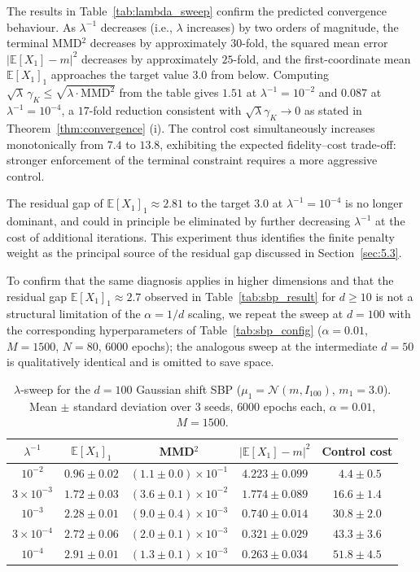 \documentclass[11pt,leqno]{article}
\theoremstyle{plain}
\theoremstyle{remark}
\theoremstyle{definition}
\numberwithin{equation}{section}
\numberwithin{figure}{section}
\numberwithin{table}{section}
\numberwithin{algorithm}{section}
\newcommand{\EE}{\mathbb{E}}
\begin{document}
The results in Table~\ref{tab:lambda_sweep} confirm the predicted convergence behaviour.
As $\lambda^{-1}$ decreases (i.e., $\lambda$ increases) by two orders of magnitude,
the terminal MMD${}^2$ decreases by approximately $30$-fold,
the squared mean error $|\EE[X_1]-m|^2$ decreases by approximately $25$-fold,
and the first-coordinate mean $\EE[X_1]_1$ approaches the target value $3.0$ from below.
Computing $\sqrt{\lambda}\,\gamma_K\le \sqrt{\lambda\cdot\mathrm{MMD}^2}$ from the table gives
$1.51$ at $\lambda^{-1}=10^{-2}$ and $0.087$ at $\lambda^{-1}=10^{-4}$,
a $17$-fold reduction consistent with $\sqrt{\lambda}\gamma_K\to 0$ as stated in Theorem~\ref{thm:convergence} (i).
The control cost simultaneously increases monotonically from $7.4$ to $13.8$,
exhibiting the expected fidelity--cost trade-off:
stronger enforcement of the terminal constraint requires a more aggressive control.

The residual gap of $\EE[X_1]_1 \approx 2.81$ to the target $3.0$ at $\lambda^{-1}=10^{-4}$
is no longer dominant, and could in principle be eliminated by further decreasing $\lambda^{-1}$ at the cost of additional iterations.
This experiment thus identifies the finite penalty weight as the principal source of the residual gap
discussed in Section~\ref{sec:5.3}.

To confirm that the same diagnosis applies in higher dimensions and that the residual gap
$\EE[X_1]_1\approx 2.7$ observed in Table~\ref{tab:sbp_result} for $d\ge 10$ is not a structural
limitation of the $\alpha=1/d$ scaling, we repeat the sweep at $d=100$
with the corresponding hyperparameters of Table~\ref{tab:sbp_config}
($\alpha=0.01$, $M=1500$, $N=80$, $6000$ epochs);
the analogous sweep at the intermediate $d=50$ is qualitatively identical
and is omitted to save space.

\begin{table}[htbp]
\centering
\caption{$\lambda$-sweep for the $d=100$ Gaussian shift SBP
($\mu_1=\mathcal{N}(m, I_{100})$, $m_1=3.0$).
Mean $\pm$ standard deviation over $3$ seeds, $6000$ epochs each, $\alpha=0.01$, $M=1500$.}
\label{tab:lambda_sweep_d100}
\begin{tabular}{ccccc}
\toprule
$\lambda^{-1}$ & $\EE[X_1]_1$ & MMD${}^2$ & $|\EE[X_1]-m|^2$ & Control cost \\
\midrule
$10^{-2}$            & $0.96\pm 0.02$ & $(1.1\pm 0.0)\times 10^{-1}$ & $4.223\pm 0.099$ & $\phantom{0}4.4\pm 0.5$ \\
$3\times 10^{-3}$    & $1.72\pm 0.03$ & $(3.6\pm 0.1)\times 10^{-2}$ & $1.774\pm 0.089$ & $16.6\pm 1.4$ \\
$10^{-3}$            & $2.28\pm 0.01$ & $(9.0\pm 0.4)\times 10^{-3}$ & $0.740\pm 0.014$ & $30.8\pm 2.0$ \\
$3\times 10^{-4}$    & $2.72\pm 0.06$ & $(2.0\pm 0.1)\times 10^{-3}$ & $0.321\pm 0.029$ & $43.3\pm 3.6$ \\
$10^{-4}$            & $2.91\pm 0.01$ & $(1.3\pm 0.1)\times 10^{-3}$ & $0.263\pm 0.034$ & $51.8\pm 4.5$ \\
\bottomrule
\end{tabular}
\end{table}
\end{document}
